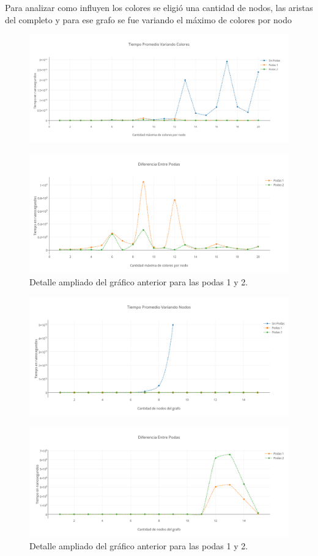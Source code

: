  Para analizar como influyen los colores se eligió una cantidad de nodos, las aristas del completo y para ese grafo se fue variando el máximo de colores por nodo

 \begin{figure}[H]
	\centering
 	\includegraphics[scale=0.45]{imagenes/ej2/Colores.png}
	\caption{}
	\label{colores}
 \end{figure}

 \begin{figure}[H]
	\centering
 	\includegraphics[scale=0.45]{imagenes/ej2/ColoresPodas.png}
	\caption{Detalle ampliado del gráfico anterior para las podas 1 y 2.}
	\label{coloresP}
 \end{figure}

 \begin{figure}[H]
	\centering
 	\includegraphics[scale=0.45]{imagenes/ej2/Nodos.png}
	\caption{}
	\label{nodos}
 \end{figure}

 \begin{figure}[H]
	\centering
 	\includegraphics[scale=0.45]{imagenes/ej2/NodosPodas.png}
	\caption{Detalle ampliado del gráfico anterior para las podas 1 y 2.}
	\label{nodosP}
 \end{figure} 